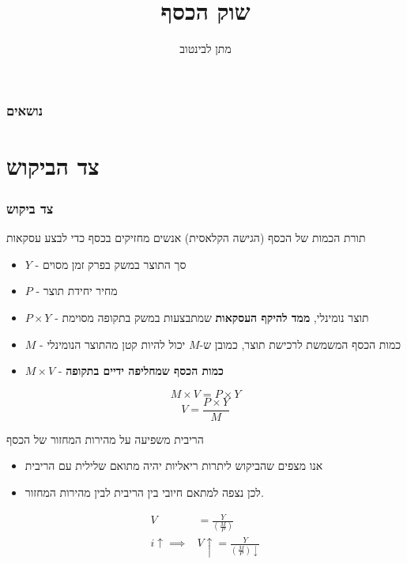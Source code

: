\documentclass[usenames,dvipsnames,10pt]{beamer}
\title[שוק הכסף]{שוק הכסף}
\author{מתן לבינטוב}
\institute[{{ אב"ג}}]{{ אוניברסיטת בן גוריון בנגב}}
\date{}
\begin{document}
\begin{RTL}
\begin{frame}
\titlepage
\end{frame}

\begin{frame}
    \frametitle{נושאים}
    \tableofcontents
\end{frame}

\section{צד הביקוש}
\begin{frame}[allowframebreaks]
    \frametitle{צד ביקוש}
    \begin{block}{תורת הכמות של הכסף (הגישה הקלאסית)}
        אנשים מחזיקים בכסף כדי לבצע עסקאות
    \begin{itemize}
        \item $Y$ - סך התוצר במשק בפרק זמן מסוים
        \item $P$ - מחיר יחידת תוצר
        \item $P \times Y$ - תוצר נומינלי, \textbf{ממד להיקף העסקאות} שמתבצעות במשק בתקופה מסוימת
        \item $M$ - כמות הכסף המשמשת לרכישת תוצר, כמובן ש-$M$ יכול להיות קטן מהתוצר הנומינלי
        \item $M \times V$ - \textbf{כמות הכסף שמחליפה ידיים בתקופה}
    \end{itemize}

    $$M \times V = P \times Y $$
    $$V = \frac{P \times Y}{M}$$

    \end{block}


    \begin{alertblock}{הריבית משפיעה על מהירות המחזור של הכסף}
        \begin{itemize}
            \item אנו מצפים שהביקוש ליתרות ריאליות יהיה מתואם שלילית עם הריבית
            \item לכן נצפה למתאם חיובי בין הריבית לבין מהירות המחזור.
        \end{itemize}
        \begin{align*}
            V &= \frac{Y}{\left(\frac{M}{P}\right)}\\
            i \uparrow \implies &V \uparrow = \frac{Y}{\left(\frac{M}{P}\right)\downarrow}
        \end{align*}
    \end{alertblock}
    


\end{frame}
\end{RTL}
\end{document}
